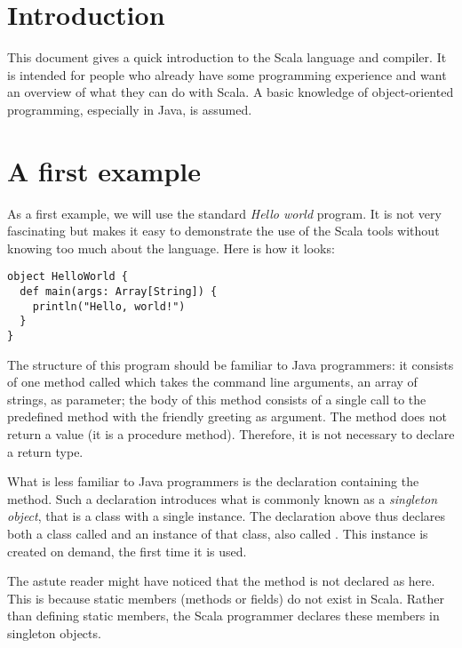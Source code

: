 \documentclass[a4paper,12pt,twoside,titlepage]{article}
\newcommand{\langname}[1]{#1\xspace}
\newcommand{\Scala}{\langname{Scala}}
\newcommand{\Java}{\langname{Java}}
\begin{document}
\makedoctitle

\section{Introduction}
\label{sec:introduction}

This document gives a quick introduction to the \Scala language and
compiler. It is intended for people who already have some programming
experience and want an overview of what they can do with \Scala. A
basic knowledge of object-oriented programming, especially in \Java,
is assumed.

\section{A first example}
\label{sec:first-example}

As a first example, we will use the standard \emph{Hello world}
program. It is not very fascinating but makes it easy to demonstrate
the use of the \Scala tools without knowing too much about the
language. Here is how it looks:
\begin{lstlisting}
object HelloWorld {
  def main(args: Array[String]) {
    println("Hello, world!")
  }
}
\end{lstlisting}

The structure of this program should be familiar to Java programmers:
it consists of one method called  which takes the command
line arguments, an array of strings, as parameter; the body of this
method consists of a single call to the predefined method 
with the friendly greeting as argument. The  method does not
return a value (it is a procedure method). Therefore, it is not necessary
to declare a return type.

What is less familiar to Java programmers is the 
declaration containing the  method. Such a declaration
introduces what is commonly known as a \emph{singleton object}, that
is a class with a single instance. The declaration above thus declares
both a class called  and an instance of that class,
also called . This instance is created on demand,
the first time it is used.

The astute reader might have noticed that the  method is
not declared as  here. This is because static members
(methods or fields) do not exist in \Scala. Rather than defining static
members, the \Scala programmer declares these members in singleton
objects.
\end{document}
